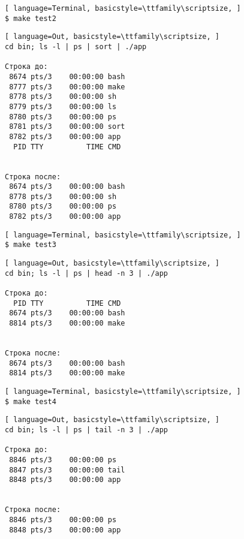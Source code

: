 \newpage


\begin{lstlisting}[ language=Terminal, basicstyle=\ttfamily\scriptsize, ]
$ make test2
\end{lstlisting}

\begin{lstlisting}[ language=Out, basicstyle=\ttfamily\scriptsize, ]
cd bin; ls -l | ps | sort | ./app

Cтрока до:
 8674 pts/3    00:00:00 bash
 8777 pts/3    00:00:00 make
 8778 pts/3    00:00:00 sh
 8779 pts/3    00:00:00 ls
 8780 pts/3    00:00:00 ps
 8781 pts/3    00:00:00 sort
 8782 pts/3    00:00:00 app
  PID TTY          TIME CMD


Строка после:
 8674 pts/3    00:00:00 bash
 8778 pts/3    00:00:00 sh
 8780 pts/3    00:00:00 ps
 8782 pts/3    00:00:00 app
\end{lstlisting}


\begin{lstlisting}[ language=Terminal, basicstyle=\ttfamily\scriptsize, ]
$ make test3
\end{lstlisting}

\begin{lstlisting}[ language=Out, basicstyle=\ttfamily\scriptsize, ]
cd bin; ls -l | ps | head -n 3 | ./app

Cтрока до:
  PID TTY          TIME CMD
 8674 pts/3    00:00:00 bash
 8814 pts/3    00:00:00 make


Строка после:
 8674 pts/3    00:00:00 bash
 8814 pts/3    00:00:00 make
\end{lstlisting}


\begin{lstlisting}[ language=Terminal, basicstyle=\ttfamily\scriptsize, ]
$ make test4
\end{lstlisting}

\begin{lstlisting}[ language=Out, basicstyle=\ttfamily\scriptsize, ]
cd bin; ls -l | ps | tail -n 3 | ./app

Cтрока до:
 8846 pts/3    00:00:00 ps
 8847 pts/3    00:00:00 tail
 8848 pts/3    00:00:00 app


Строка после:
 8846 pts/3    00:00:00 ps
 8848 pts/3    00:00:00 app
\end{lstlisting}